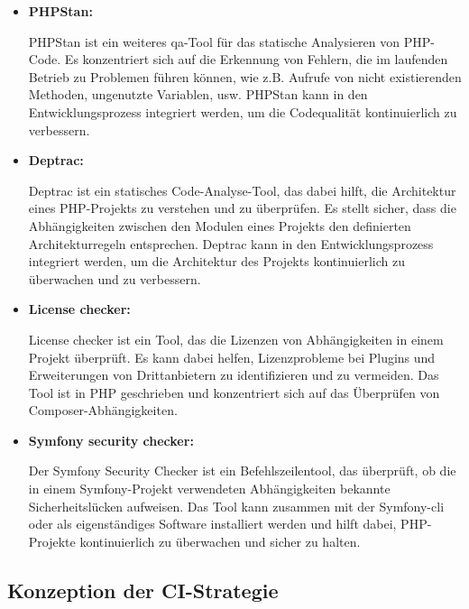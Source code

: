 \begin{itemize}
    \item {
        \textbf{PHPStan:}\par
        PHPStan ist ein weiteres \acrshort{qa}-Tool für das statische Analysieren von PHP-Code.
        Es konzentriert sich auf die Erkennung von Fehlern, die im laufenden Betrieb zu Problemen führen können, wie
        z.B. Aufrufe von nicht existierenden Methoden, ungenutzte Variablen, usw.
        PHPStan kann in den Entwicklungsprozess integriert werden, um die Codequalität kontinuierlich zu verbessern.
    }

    \item {
        \textbf{Deptrac:}\par
        Deptrac ist ein statisches Code-Analyse-Tool, das dabei hilft, die Architektur eines PHP-Projekts zu verstehen
        und zu überprüfen.
        Es stellt sicher, dass die Abhängigkeiten zwischen den Modulen eines Projekts den definierten Architekturregeln
        entsprechen.
        Deptrac kann in den Entwicklungsprozess integriert werden, um die Architektur des Projekts kontinuierlich zu
        überwachen und zu verbessern.
    }

    \item {
        \textbf{License checker:}\par
        License checker ist ein Tool, das die Lizenzen von Abhängigkeiten in einem Projekt überprüft.
        Es kann dabei helfen, Lizenzprobleme bei Plugins und Erweiterungen von Drittanbietern zu identifizieren und zu
        vermeiden.
        Das Tool ist in PHP geschrieben und konzentriert sich auf das Überprüfen von Composer-Abhängigkeiten.
    }

    \item {
        \textbf{Symfony security checker:}\par
        Der Symfony Security Checker ist ein Befehlszeilentool, das überprüft, ob die in einem Symfony-Projekt
        verwendeten Abhängigkeiten bekannte Sicherheitslücken aufweisen.
        Das Tool kann zusammen mit der Symfony-\acrshort{cli} oder als eigenständiges Software installiert werden und
        hilft dabei, PHP-Projekte kontinuierlich zu überwachen und sicher zu halten.
    }
\end{itemize}

\subsection{Konzeption der CI-Strategie} \label{subsec:03-concept-3}

